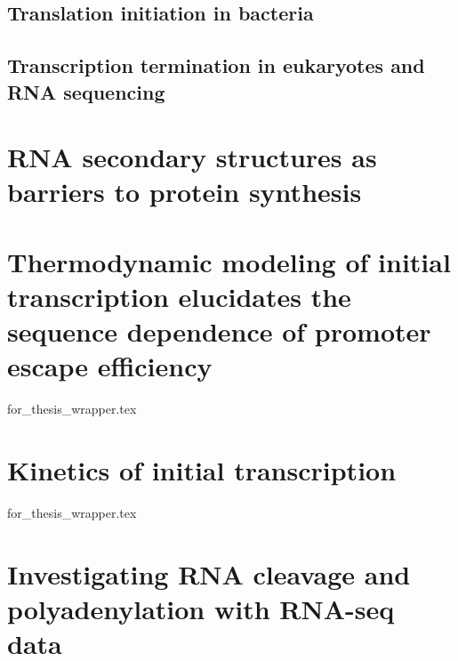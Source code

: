 \documentclass[]{ntnuthesis}
\begin{document}
\section{Translation initiation in bacteria}
\begin{refsection}

\printbibliography
\end{refsection}
\newpage

\begin{refsection}
\section{Transcription termination in eukaryotes and RNA sequencing}



\printbibliography
\end{refsection}
\newpage

\chapter{RNA secondary structures as barriers to protein synthesis}
\begin{refsection}
\label{chap:celB}

\printbibliography
\end{refsection}

\chapter{Thermodynamic modeling of initial transcription elucidates the sequence dependence of promoter escape efficiency}
\begin{refsection}

\label{chap:initiation_paper}
{for_thesis_wrapper.tex}
\printbibliography
\end{refsection}

\chapter{Kinetics of initial transcription}
\begin{refsection}

\label{chap:kinetics_paper}
{for_thesis_wrapper.tex}
\printbibliography
\end{refsection}

\chapter{Investigating RNA cleavage and polyadenylation with RNA-seq data}
\begin{refsection}
\label{chap:polyA}

\printbibliography
\end{refsection}
\end{document}
